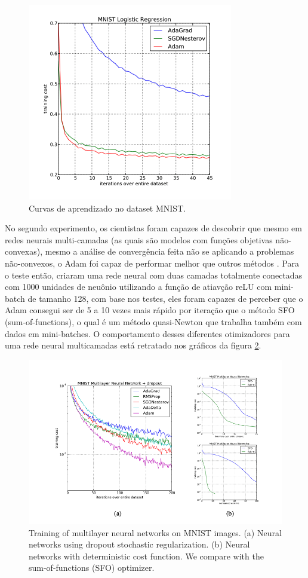\begin{figure}[h]
    \centering
    \includegraphics[width=0.65\linewidth]{../imagens/retropropagacao-gradiente/comparativo-adam-mnist.png}
    \caption{Curvas de aprendizado no dataset MNIST.}
    \label{fig:comparativo-adam-mnist}
\end{figure}

No segundo experimento, os cientistas foram capazes de descobrir que mesmo em redes neurais multi-camadas (as quais são modelos com funções objetivas não-convexas), mesmo a análise de convergência feita não se aplicando a problemas não-convexos, o Adam foi capaz de performar melhor que outros métodos \parencite{AdamMethod}. Para o teste então, \textcite{AdamMethod} criaram uma rede neural com duas camadas totalmente conectadas com 1000 unidades de neuônio utilizando a função de atiavção reLU com mini-batch de tamanho 128, com base nos testes, eles foram capazes de perceber que o Adam consegui ser de 5 a 10 vezes mais rápido por iteração que o método SFO (sum-of-functions), o qual é um método quasi-Newton que trabalha também com dados em mini-batches. O comportamento desses diferentes otimizadores para uma rede neural multicamadas está retratado nos gráficos da figura \ref{fig:comparativo-adam-multilayer}.

\begin{figure}[h]
    \centering
    \includegraphics[width=0.85\linewidth]{../imagens/retropropagacao-gradiente/comparativo-adam-multilayer.png}
    \caption{Training of multilayer neural networks on MNIST images. (a) Neural networks using dropout stochastic regularization. (b) Neural networks with deterministic cost function. We compare with the sum-of-functions (SFO) optimizer.}
    \label{fig:comparativo-adam-multilayer}
\end{figure}

